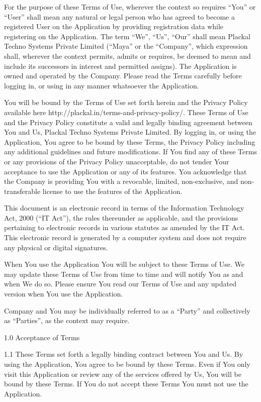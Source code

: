 For the purpose of these Terms of Use, wherever the context so requires “You” or “User” shall mean any natural or legal person who has agreed to become a registered User on the Application by providing registration data while registering on the Application. The term “We”, “Us”, “Our” shall mean Plackal Techno Systems Private Limited (“Maya” or the “Company”, which expression shall, wherever the context permits, admits or requires, be deemed to mean and include its successors in interest and permitted assigns). The Application is owned and operated by the Company. Please read the Terms carefully before logging in, or using in any manner whatsoever the Application.

You will be bound by the Terms of Use set forth herein and the Privacy Policy available here http://plackal.in/terms-and-privacy-policy/. These Terms of Use and the Privacy Policy constitute a valid and legally binding agreement between You and Us, Plackal Techno Systems Private Limited. By logging in, or using the Application, You agree to be bound by these Terms, the Privacy Policy including any additional guidelines and future modifications. If You find any of these Terms or any provisions of the Privacy Policy unacceptable, do not tender Your acceptance to use the Application or any of its features. You acknowledge that the Company is providing You with a revocable, limited, non-exclusive, and non-transferable license to use the features of the Application.

This document is an electronic record in terms of the Information Technology Act, 2000 (“IT Act”), the rules thereunder as applicable, and the provisions pertaining to electronic records in various statutes as amended by the IT Act. This electronic record is generated by a computer system and does not require any physical or digital signatures.

When You use the Application You will be subject to these Terms of Use. We may update these Terms of Use from time to time and will notify You as and when We do so. Please ensure You read our Terms of Use and any updated version when You use the Application.

Company and You may be individually referred to as a “Party” and collectively as “Parties”, as the context may require.

 

1.0       Acceptance of Terms

1.1       These Terms set forth a legally binding contract between You and Us. By using the Application, You agree to be bound by these Terms. Even if You only visit this Application or review any of the services offered by Us, You will be bound by these Terms. If You do not accept these Terms You must not use the Application.

